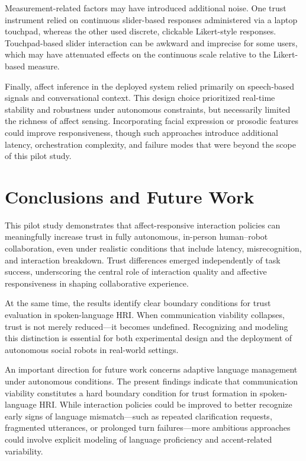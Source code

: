 \documentclass[
  letterpaper,
  DIV=11,
  numbers=noendperiod]{scrartcl}
\begin{document}
Measurement-related factors may have introduced additional noise. One
trust instrument relied on continuous slider-based responses
administered via a laptop touchpad, whereas the other used discrete,
clickable Likert-style responses. Touchpad-based slider interaction can
be awkward and imprecise for some users, which may have attenuated
effects on the continuous scale relative to the Likert-based measure.

Finally, affect inference in the deployed system relied primarily on
speech-based signals and conversational context. This design choice
prioritized real-time stability and robustness under autonomous
constraints, but necessarily limited the richness of affect sensing.
Incorporating facial expression or prosodic features could improve
responsiveness, though such approaches introduce additional latency,
orchestration complexity, and failure modes that were beyond the scope
of this pilot study.

\section{Conclusions and Future Work}\label{conclusions-and-future-work}

This pilot study demonstrates that affect-responsive interaction
policies can meaningfully increase trust in fully autonomous, in-person
human--robot collaboration, even under realistic conditions that include
latency, misrecognition, and interaction breakdown. Trust differences
emerged independently of task success, underscoring the central role of
interaction quality and affective responsiveness in shaping
collaborative experience.

At the same time, the results identify clear boundary conditions for
trust evaluation in spoken-language HRI. When communication viability
collapses, trust is not merely reduced---it becomes undefined.
Recognizing and modeling this distinction is essential for both
experimental design and the deployment of autonomous social robots in
real-world settings.

An important direction for future work concerns adaptive language
management under autonomous conditions. The present findings indicate
that communication viability constitutes a hard boundary condition for
trust formation in spoken-language HRI. While interaction policies could
be improved to better recognize early signs of language mismatch---such
as repeated clarification requests, fragmented utterances, or prolonged
turn failures---more ambitious approaches could involve explicit
modeling of language proficiency and accent-related variability.
\end{document}
